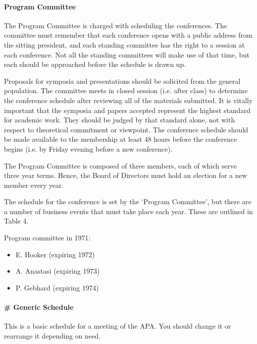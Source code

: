\paragraph{Program Committee}
\label{programcommittee}

The Program Committee is charged with scheduling the conferences. The committee must remember that each conference opens with a public address from the sitting president, and each standing committee has the right to a session at each conference. Not all the standing committees will make use of that time, but each should be approached before the schedule is drawn up.

Proposals for symposia and presentations should be solicited from the general population. The committee meets in closed session (i.e. after class) to determine the conference schedule after reviewing all of the materials submitted. It is vitally important that the symposia and papers accepted represent the highest standard for academic work. They should be judged by that standard alone, not with respect to theoretical commitment or viewpoint. The conference schedule should be made available to the membership at least 48 hours before the conference begins (i.e. by Friday evening before a new conference).

The Program Committee is composed of three members, each of which serve three year terms. Hence, the Board of Directors must hold an election for a new member every year.

The schedule for the conference is set by the `Program Committee', but there are a number of business events that must take place each year. These are outlined in Table 4.

Program committee in 1971:

\begin{itemize}
\item E. Hooker (expiring 1972)

\item A. Anastasi (expiring 1973)

\item P. Gebhard (expiring 1974)

\end{itemize}

\paragraph{\# Generic Schedule}
\label{genericschedule}

This is a basic schedule for a meeting of the APA. You should change it or rearrange it depending on need.

